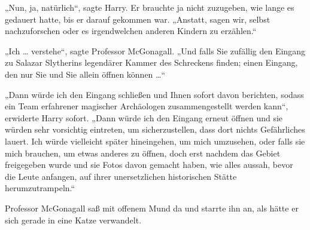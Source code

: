 „Nun, ja, natürlich“, sagte Harry. Er brauchte ja nicht zuzugeben, wie lange es gedauert hatte, bis er darauf gekommen war.
„Anstatt, sagen wir, selbst nachzuforschen oder es irgendwelchen anderen Kindern zu erzählen.“

„Ich … verstehe“, sagte Professor McGonagall.
„Und falls Sie zufällig den Eingang zu Salazar Slytherins legendärer Kammer des Schreckens finden; einen Eingang, den nur Sie und Sie allein öffnen können …“

„Dann würde ich den Eingang schließen und Ihnen sofort davon berichten, sodass ein Team erfahrener magischer Archäologen zusammengestellt werden kann“, erwiderte Harry sofort.
„Dann würde ich den Eingang erneut öffnen und sie würden sehr vorsichtig eintreten, um sicherzustellen, dass dort nichts Gefährliches lauert. Ich würde vielleicht später hineingehen, um mich umzusehen, oder falls sie mich brauchen, um etwas anderes zu öffnen, doch erst nachdem das Gebiet freigegeben wurde und sie Fotos davon gemacht haben, wie alles aussah, bevor die Leute anfangen, auf ihrer unersetzlichen historischen Stätte herumzutrampeln.“



Professor McGonagall saß mit offenem Mund da und starrte ihn an, als hätte er sich gerade in eine Katze verwandelt.

